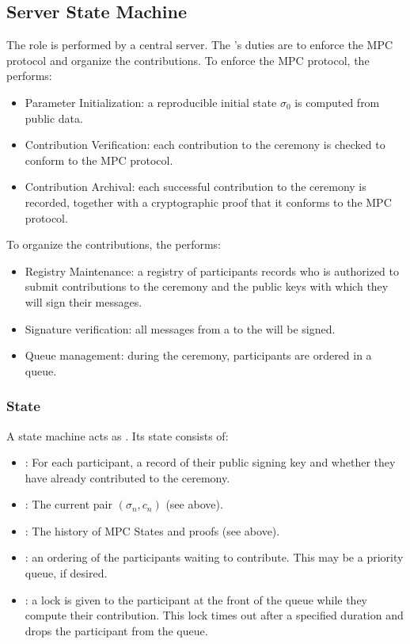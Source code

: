 \subsection{Server State Machine}

The \Coordinator{} role is performed by a central server. The \Coordinator{}'s duties are to enforce the MPC protocol and organize the contributions. To enforce the MPC protocol, the \Coordinator{} performs:
\begin{itemize}
    \item Parameter Initialization: a reproducible initial state $\sigma_0$ is computed from public data.
    \item Contribution Verification: each contribution to the ceremony is checked to conform to the MPC protocol.
    \item Contribution Archival: each successful contribution to the ceremony is recorded, together with a cryptographic proof that it conforms to the MPC protocol.
\end{itemize}
To organize the contributions, the \Coordinator{} performs:
\begin{itemize}
    \item Registry Maintenance: a registry of participants records who is authorized to submit contributions to the ceremony and the public keys with which they will sign their messages.
    \item Signature verification: all messages from a \Contributor{} to the \Coordinator{} will be signed.
    \item Queue management: during the ceremony, participants are ordered in a queue.
\end{itemize}

\subsubsection*{State}
A state machine acts as \Coordinator{}. Its state consists of:
\begin{itemize}
    \item \Registry{}: For each participant, a record of their public signing key and whether they have already contributed to the ceremony.
    \item \MpcState{}: The current pair $(\sigma_n, c_n)$ (see above). 
    \item \Transcript{}: The history of MPC States and proofs (see above).
    \item \Queue{}: an ordering of the participants waiting to contribute. This may be a priority queue, if desired.
    \item \TimedLock{}: a lock is given to the participant at the front of the queue while they compute their contribution. This lock times out after a specified duration and drops the participant from the queue.
\end{itemize}

